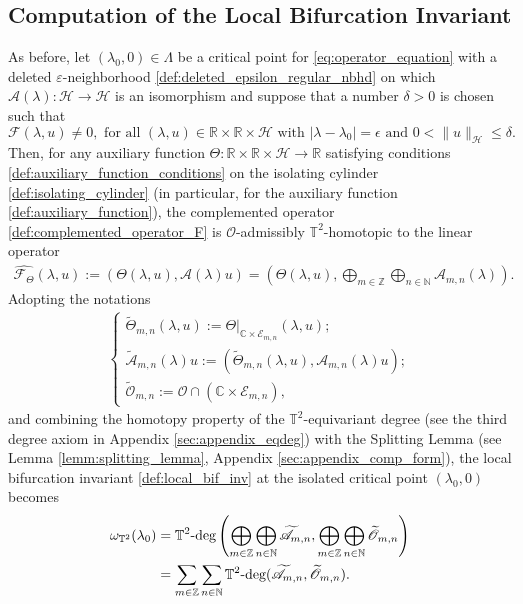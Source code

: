 \documentclass[11pt]{amsart}
\def\bc{{\mathbb{C}}}
\def\bn{{\mathbb{N}}}
\def\br{{\mathbb{R}}}
\def\bz{{\mathbb{Z}}}
\def\bt{{\mathbb{T}}}
\def\br{\mathbb R}
\def\wt{\widetilde}
\def\wt{\widetilde}
\def\t2deg{\mathbb T^2\text{\rm -deg}}
\begin{document}
\subsection{Computation of the Local Bifurcation Invariant} \label{sec:computation_local_bif_inv}
As before, let $(\lambda_0,0) \in \Lambda$ be a critical point for \eqref{eq:operator_equation} with a deleted $\varepsilon$-neighborhood \eqref{def:deleted_epsilon_regular_nbhd} on which $\mathscr A(\lambda):\mathscr H \rightarrow \mathscr H$ is an isomorphism and suppose that a number $\delta > 0$ is chosen such that
\[
\mathscr F(\lambda,u) \neq 0, \text{ for all } (\lambda,u) \in \br \times \br \times \mathscr H \text{ with } |\lambda - \lambda_0| = \epsilon \text{ and } 0 < \| u \|_{\mathscr H} \leq \delta.
\]
Then, for any auxiliary function $\Theta:\br \times \br \times \mathscr H \rightarrow \br$ satisfying conditions \eqref{def:auxiliary_function_conditions} on the isolating cylinder \eqref{def:isolating_cylinder} (in particular, for the auxiliary function \eqref{def:auxiliary_function}), the complemented operator \eqref{def:complemented_operator_F} is $\mathscr O$-admissibly $\bt^2$-homotopic to the linear operator
\begin{align*}
    \hat{\mathscr F_\Theta}(\lambda,u) := (\Theta(\lambda,u),\mathscr A(\lambda)u)  = \left(\Theta(\lambda,u), \bigoplus_{m\in \bz}\bigoplus_{n\in\bn} \mathscr A_{m,n}(\lambda)  \right).
\end{align*}   
Adopting the notations
\begin{align*}
\begin{cases}
\wt{\Theta}_{m,n}(\lambda,u) :=        \Theta|_{\bc \times \mathscr E_{m,n}}(\lambda,u);\\ \wt{\mathscr A}_{m,n}(\lambda)u := \left(\wt{\Theta}_{m,n}(\lambda,u), \mathscr A_{m,n}(\lambda)u\right); \\ \wt{\mathscr O}_{m,n} :=  \mathscr O \cap \left(\bc \times \mathscr E_{m,n}\right),
\end{cases}
\end{align*}
and combining the homotopy property of the $\bt^2$-equivariant degree (see the third degree axiom in Appendix \ref{sec:appendix_eqdeg}) with the Splitting Lemma (see Lemma \eqref{lemm:splitting_lemma}, Appendix \ref{sec:appendix_comp_form}), the local bifurcation invariant \eqref{def:local_bif_inv} at the isolated critical point $(\lambda_0,0)$ becomes
\begin{align}
\label{eq:local_bif_inv_reformulation}
\omega_{\bt^2}(\lambda_0) &= \t2deg\left( 
\bigoplus_{m \in \bz} \bigoplus_{n \in \bn}  \wt{\mathscr A}_{m,n}, \bigoplus_{m \in \bz} \bigoplus_{n \in \bn} \wt{\mathscr O}_{m,n} \right) \\ &= 
\sum_{m \in \bz} \sum_{n \in \bn} \t2deg(\wt{\mathscr A}_{m,n},  \wt{\mathscr O}_{m,n}). \nonumber
\end{align}
\end{document}
